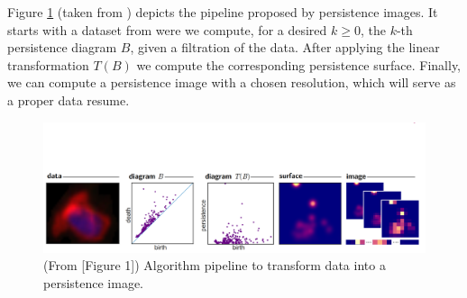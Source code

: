 \begin{example}
    Figure \ref{fig:persistent-images} (taken from \cite{adams}) depicts the pipeline proposed by persistence images. It starts with a dataset from were we compute, for a desired $k \geq 0 $, the $k$-th persistence diagram $ B $, given a filtration of the data. After applying the linear transformation $T(B)$ we compute the corresponding persistence surface. Finally, we can compute a persistence image with a chosen resolution, which will serve as a proper data resume.        
    \begin{figure}[H]
        \centering
        \includegraphics[width=\linewidth, trim=0 0 0 200, clip]{figures/persistent-images.png}
        \caption[Persistence images pipeline]{(From \cite{adams}[Figure 1]) Algorithm pipeline to transform data into a persistence image.}
        \label{fig:persistent-images}
\end{figure}
\end{example}

